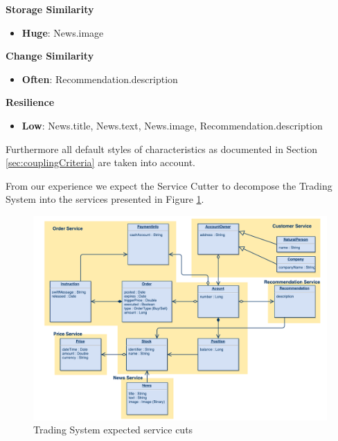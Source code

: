 \textbf{Storage Similarity}

\begin{itemize}
\item \textbf{Huge}: News.image
\end{itemize}

\textbf{Change Similarity}

\begin{itemize}
\item \textbf{Often}: Recommendation.description
\end{itemize}

\textbf{Resilience}

\begin{itemize}
\item \textbf{Low}: News.title, News.text, News.image, Recommendation.description
\end{itemize}

Furthermore all default styles of characteristics as documented in Section \ref{sec:couplingCriteria} are taken into account.

From our experience we expect the Service Cutter to decompose the Trading System into the services presented in Figure \ref{fig:tradingCuts}.

\begin{figure}[H]
	\includegraphics[scale=0.5]{diagrams/TradingSystem-ServiceCut.pdf}
	\caption{Trading System expected service cuts}
	\label{fig:tradingCuts}
\end{figure}